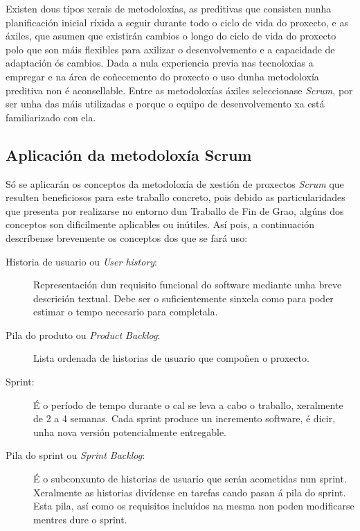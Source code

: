 Existen dous tipos xerais de metodoloxías, as preditivas que consisten nunha planificación inicial ríxida a seguir durante todo o ciclo de vida do proxecto, e as áxiles, que asumen que existirán cambios o longo do ciclo de vida do proxecto polo que son máis flexibles para axilizar o desenvolvemento e a capacidade de adaptación ós cambios. Dada a nula experiencia previa nas tecnoloxías a empregar e  na área de coñecemento do proxecto o uso dunha metodoloxía preditiva non é aconsellable. Entre as metodoloxías áxiles seleccionase \emph{Scrum}\cite{ScrumManager}, por ser unha das máis utilizadas e porque o equipo de desenvolvemento xa está familiarizado con ela.

\subsection{Aplicación da metodoloxía Scrum}

Só se aplicarán os conceptos da metodoloxía de xestión de proxectos \emph{Scrum} que resulten beneficiosos para este traballo concreto, pois debido as particularidades que presenta por realizarse no entorno dun Traballo de Fin de Grao, algúns dos conceptos son dificilmente aplicables ou inútiles. Así pois, a continuación descríbense brevemente os conceptos dos que se fará uso:
\begin{description}
\item[Historia de usuario ou \emph{User history}:] Representación dun requisito funcional do software mediante unha breve descrición textual. Debe ser o suficientemente sinxela como para poder estimar o tempo necesario para completala.
\item[Pila do produto ou \emph{Product Backlog}:] Lista ordenada de historias de usuario que compoñen o proxecto.
\item[Sprint:] É o período de tempo durante o cal se leva a cabo o traballo, xeralmente de 2 a 4 semanas. Cada sprint produce un incremento software, é dicir, unha nova versión potencialmente entregable.
\item[Pila do sprint ou \emph{Sprint Backlog}:] É o subconxunto de historias de usuario que serán acometidas nun sprint. Xeralmente as historias divídense en tarefas cando pasan á pila do sprint. Esta pila, así como os requisitos incluídos na mesma non poden modificarse mentres dure o sprint.
\end{description}

